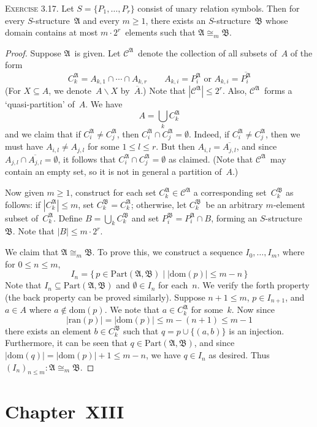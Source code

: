 \documentclass[letterpaper]{article}
\newcommand{\iso}{\cong}
\newcommand{\union}{\cup}
\newcommand{\sect}{\cap}
\newcommand{\bigunion}{\bigcup}
\newcommand{\A}{\mathfrak{A}}
\newcommand{\B}{\mathfrak{B}}
\newcommand{\pisos}{\mathrm{Part}}
\newcommand{\dom}{\mathrm{dom}}
\newcommand{\ran}{\mathrm{ran}}
\theoremstyle{remark}
\begin{document}
\noindent\textsc{Exercise 3.17.}
Let $S=\{P_1,\ldots,P_r\}$ consist of unary relation symbols. Then for every $S$-structure~$\A$ and every $m\ge1$, there exists an $S$-structure~$\B$ whose domain contains at most $m\cdot2^r$~elements such that $\A\iso_m\B$.
\begin{proof}
Suppose $\A$~is given. Let $\mathcal{C}^{\A}$~denote the collection of all subsets of~$A$ of the form
$$C_k^{\A}=A_{k,1}\sect\cdots\sect A_{k,r}\qquad A_{k,i}=P_i^{\A}\text{ or }A_{k,i}=\overline{P_i^{\A}}$$
(For $X\subseteq A$, we denote~$A\backslash X$ by~$\overline{A}$.) Note that $|\mathcal{C}^{\A}|\le2^r$. Also, $\mathcal{C}^{\A}$~forms a `quasi-partition' of~$A$. We have
$$A=\bigunion_k C_k^{\A}$$
and we claim that if $C_i^{\A}\ne C_j^{\A}$, then $C_i^{\A}\sect C_j^{\A}=\emptyset$. Indeed, if $C_i^{\A}\ne C_j^{\A}$, then we must have $A_{i,l}\ne A_{j,l}$ for some $1\le l\le r$. But then $A_{i,l}=\overline{A_{j,l}}$, and since $A_{j,l}\sect\overline{A_{j,l}}=\emptyset$, it follows that $C_i^{\A}\sect C_j^{\A}=\emptyset$ as claimed. (Note that $\mathcal{C}^{\A}$~may contain an empty set, so it is not in general a partition of~$A$.)

Now given $m\ge 1$, construct for each set $C_k^{\A}\in\mathcal{C}^{\A}$ a corresponding set~$C_k^{\B}$ as follows: if $|C_k^{\A}|\le m$, set $C_k^{\B}=C_k^{\A}$; otherwise, let $C_k^{\B}$~be an arbitrary $m$-element subset of~$C_k^{\A}$. Define $B=\bigunion_k C_k^{\B}$ and set $P_i^{\B}=P_i^{\A}\sect B$, forming an $S$-structure~$\B$. Note that $|B|\le m\cdot2^r$.

We claim that $\A\iso_m\B$. To prove this, we construct a sequence $I_0,\ldots,I_m$, where for $0\le n\le m$,
$$I_n=\{\,p\in\pisos(\A,\B)\mid |\dom(p)|\le m-n\,\}$$
Note that $I_n\subseteq\pisos(\A,\B)$ and $\emptyset\in I_n$ for each~$n$. We verify the forth property (the back property can be proved similarly). Suppose $n+1\le m$, $p\in I_{n+1}$, and $a\in A$ where $a\not\in\dom(p)$. We note that $a\in C_k^{\A}$ for some~$k$. Now since
$$|\ran(p)|=|\dom(p)|\le m-(n+1)\le m-1$$
there exists an element $b\in C_k^{\B}$ such that $q=p\union\{(a,b)\}$ is an injection. Furthermore, it can be seen that $q\in\pisos(\A,\B)$, and since $|\dom(q)|=|\dom(p)|+1\le m-n$, we have $q\in I_n$ as desired. Thus $(I_n)_{n\le m}:\A\iso_m\B$.
\end{proof}

\section*{Chapter~XIII}
\end{document}
